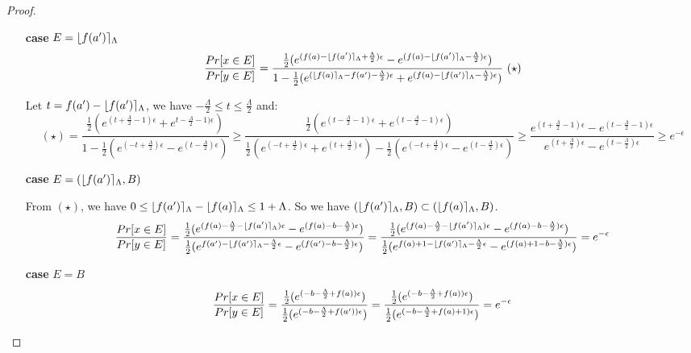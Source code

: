 \documentclass[a4paper,11pt]{article}
\begin{document}
\begin{proof}
\begin{itemize}
{	}

	\item[\textbf{case}] $E = \lfloor f(a') \rceil_{\Lambda}$
	\[
	\frac{Pr[x \in E]}{Pr[y \in E]} 
	= \frac{
			\frac{1}{2}(
				e^{(f(a) - \round{f(a')}_{\Lambda} + \frac{\Lambda}{2})\epsilon}
				- e^{(f(a) - \round{f(a')}_{\Lambda} - \frac{\Lambda}{2})\epsilon})
			}
			{1 - {\frac{1}{2}(
				e^{(\round{f(a)}_{\Lambda} - f(a') - \frac{\Lambda}{2})\epsilon}
				+ e^{(f(a) - \round{f(a')}_{\Lambda} -\frac{\Lambda}{2})\epsilon})}
			}~(\star)
	\]

	Let $t = f(a') - \lfloor f(a') \rceil_{\Lambda}$, we have $-\frac{\Lambda}{2} \leq t \leq \frac{\Lambda}{2} $ and:
	\[
	(\star) = \frac{{\frac{1}{2}(
				e^{(t + \frac{\Lambda}{2} - 1)\epsilon}
				+ e^{t - \frac{\Lambda}{2} - 1)\epsilon})}
			}
			{1 - \frac{1}{2}(
				e^{(- t + \frac{\Lambda}{2})\epsilon}
				- e^{(t - \frac{\Lambda}{2})\epsilon})}
	\geq \frac{ \frac{1}{2}(
				e^{(t - \frac{\Lambda}{2} - 1)\epsilon}
				+ e^{(t -\frac{\Lambda}{2} - 1)\epsilon})
			}
			{\frac{1}{2}(
				e^{(-t + \frac{\Lambda}{2})\epsilon}
				+ e^{(t +\frac{\Lambda}{2})\epsilon}) 
				- \frac{1}{2}(
				e^{(-t + \frac{\Lambda}{2})\epsilon}
				- e^{(t - \frac{\Lambda}{2})\epsilon})}
	\geq \frac{
				e^{(t + \frac{\Lambda}{2} - 1)\epsilon}
				-
				e^{(t - \frac{\Lambda}{2} - 1)\epsilon}
			}
			{
				e^{(t + \frac{\Lambda}{2})\epsilon}
				- e^{(t - \frac{\Lambda}{2})\epsilon}
			}	
	\geq e^{-\epsilon}
	\]
	
	\item[\textbf{case}] $E = (\lfloor f(a') \rceil_{\Lambda}, B)$

	From $(\star)$, we have $0 \leq \lfloor f(a') \rceil_{\Lambda} - \lfloor f(a) \rceil_{\Lambda} \leq 1 + \Lambda$.
	So we have $(\lfloor f(a') \rceil_{\Lambda}, B) \subset (\lfloor f(a) \rceil_{\Lambda}, B)$.
	\[
	\frac{Pr[x \in E]}{Pr[y \in E]} 
	= \frac{\frac{1}{2}(
				e^{(f(a) - \frac{\Lambda}{2} - \lfloor f(a') \rceil_{\Lambda})\epsilon}
				- e^{(f(a) -b - \frac{\Lambda}{2})\epsilon})}
				{\frac{1}{2}(
				e^{f(a') - \lfloor f(a') \rceil_{\Lambda} -\frac{\Lambda}{2}\epsilon}
				- e^{(f(a') -b -\frac{\Lambda}{2})\epsilon})} \\
	= \frac{\frac{1}{2}(
				e^{(f(a) - \frac{\Lambda}{2} - \lfloor f(a') \rceil_{\Lambda})\epsilon}
				- e^{(f(a) -b - \frac{\Lambda}{2})\epsilon})}
				{\frac{1}{2}(
				e^{f(a) + 1 - \lfloor f(a') \rceil_{\Lambda} -\frac{\Lambda}{2}\epsilon}
				- e^{(f(a) + 1 -b -\frac{\Lambda}{2})\epsilon})} \\
	= e^{-\epsilon}
	\]
	\item[\textbf{case}] $E = B$
	\[
	\frac{Pr[x \in E]}{Pr[y \in E]} 
	= \frac{\frac{1}{2}(
				e^{(-b -\frac{\Lambda}{2} + f(a))\epsilon})}
				{\frac{1}{2}(
				e^{(-b -\frac{\Lambda}{2} + f(a'))\epsilon})} \\
	= \frac{\frac{1}{2}(
				e^{(-b -\frac{\Lambda}{2} + f(a))\epsilon})}
				{\frac{1}{2}(
				e^{(-b -\frac{\Lambda}{2} + f(a) + 1)\epsilon})} \\
	= e^{-\epsilon}
	\]



\end{itemize}

\end{proof}
\newpage


\end{document}

